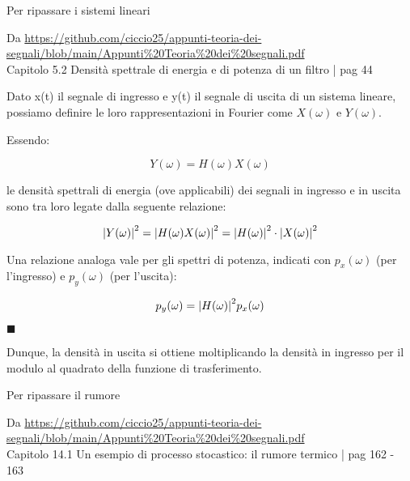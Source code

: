 \begin{tcolorbox}
    Per ripassare i sistemi lineari \newline 

    Da \url{https://github.com/ciccio25/appunti-teoria-dei-segnali/blob/main/Appunti%20Teoria%20dei%20segnali.pdf} \\
    Capitolo 5.2 Densità spettrale di energia e di potenza di un filtro | pag 44 \newline 

Dato x(t) il segnale di ingresso e y(t) il segnale di uscita di un sistema lineare, 
possiamo definire le loro rappresentazioni in Fourier come $X(\omega)$ e $Y(\omega)$. \newline 

Essendo: 

{
    \Large 
    \begin{equation}
        Y(\omega) = H(\omega) X(\omega)
    \end{equation}
}

le densità spettrali di energia (ove applicabili) dei segnali in ingresso e in uscita sono tra 
loro legate dalla seguente relazione: 

{
    \Large 
    \begin{equation}
        \abs{Y(\omega)} ^{2} 
        = 
        \abs{H(\omega) X(\omega)} ^{2} 
        = 
        \abs{H(\omega)} ^{2} \cdot \abs{X(\omega)} ^{2}
    \end{equation}
}

Una relazione analoga vale per gli spettri di potenza, indicati con $p_x (\omega)$ 
(per l'ingresso) e $p_y (\omega)$ (per l'uscita): 

{
    \Large 
    \begin{equation}
        p_y (\omega) = \abs{H(\omega)} ^{2} p_x (\omega)
    \end{equation}
}

$\blacksquare$ \newline 

Dunque, la densità in uscita si ottiene moltiplicando la densità in ingresso 
per il modulo al quadrato della funzione di trasferimento. \newline 


    Per ripassare il rumore \newline 

    Da \url{https://github.com/ciccio25/appunti-teoria-dei-segnali/blob/main/Appunti%20Teoria%20dei%20segnali.pdf} \\
    Capitolo 14.1 Un esempio di processo stocastico: il rumore termico | pag 162 - 163 \newline 


\end{tcolorbox}
